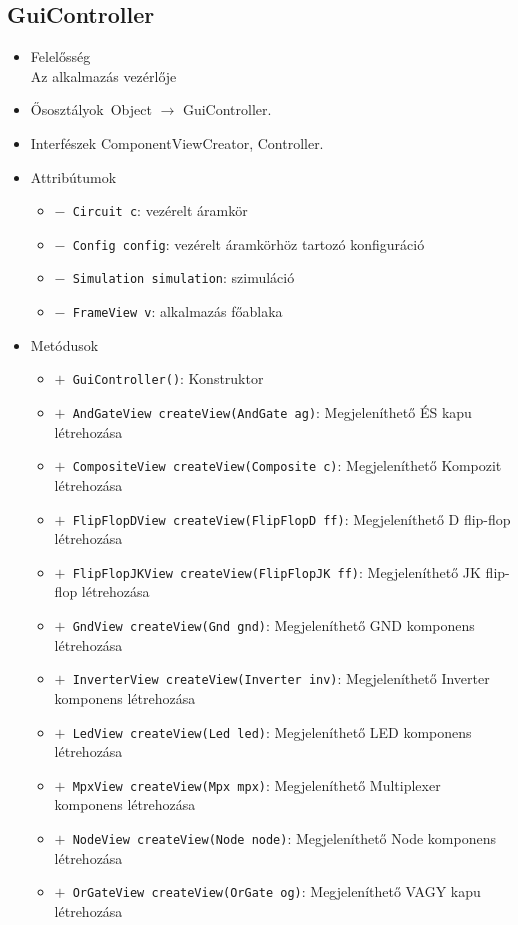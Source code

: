 \subsection{GuiController}
\begin{itemize}
\item Felelősség\\
Az alkalmazás vezérlője
\item Ősosztályok\ Object $\rightarrow{}$ GuiController.
\item Interfészek ComponentViewCreator, Controller.
\item Attribútumok $\ $
\begin{itemize}
	\item[] \texttt{$-$ Circuit c}: vezérelt áramkör
	\item[] \texttt{$-$ Config config}: vezérelt áramkörhöz tartozó konfiguráció
	\item[] \texttt{$-$ Simulation simulation}: szimuláció
	\item[] \texttt{$-$ FrameView v}: alkalmazás főablaka
\end{itemize}
\item Metódusok$\ $
\begin{itemize}
	\item[] \texttt{$+$ GuiController()}: Konstruktor
	\item[] \texttt{$+$ AndGateView createView(AndGate ag)}: Megjeleníthető ÉS kapu létrehozása
	\item[] \texttt{$+$ CompositeView createView(Composite c)}: Megjeleníthető Kompozit létrehozása
	\item[] \texttt{$+$ FlipFlopDView createView(FlipFlopD ff)}: Megjeleníthető D flip-flop létrehozása
	\item[] \texttt{$+$ FlipFlopJKView createView(FlipFlopJK ff)}: Megjeleníthető JK flip-flop létrehozása
	\item[] \texttt{$+$ GndView createView(Gnd gnd)}: Megjeleníthető GND komponens létrehozása
	\item[] \texttt{$+$ InverterView createView(Inverter inv)}: Megjeleníthető Inverter komponens létrehozása
	\item[] \texttt{$+$ LedView createView(Led led)}: Megjeleníthető LED komponens létrehozása
	\item[] \texttt{$+$ MpxView createView(Mpx mpx)}: Megjeleníthető Multiplexer komponens létrehozása
	\item[] \texttt{$+$ NodeView createView(Node node)}: Megjeleníthető Node komponens létrehozása
	\item[] \texttt{$+$ OrGateView createView(OrGate og)}: Megjeleníthető VAGY kapu létrehozása

\end{itemize}
\end{itemize}
